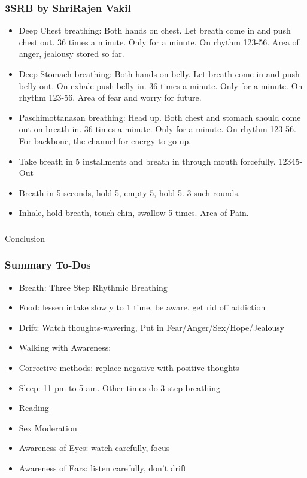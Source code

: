 \begin{frame}[fragile]
\frametitle{3SRB by ShriRajen Vakil}


\begin{itemize}
\item Deep Chest breathing: Both hands on chest. Let breath come in and push chest out. 36 times a minute. Only for a minute. On rhythm 123-56. Area of anger, jealousy stored so far.
\item Deep Stomach breathing: Both hands on belly. Let breath come in and push belly out. On exhale push belly in. 36 times a minute. Only for a minute. On rhythm 123-56. Area of fear and worry for future.
\item Paschimottanasan breathing: Head up. Both chest and stomach should come out on breath in. 36 times a minute. Only for a minute. On rhythm 123-56. For backbone, the channel for energy to go up.
\item Take breath in 5 installments and breath in through mouth forcefully. 12345-Out
\item Breath in 5 seconds, hold 5, empty 5, hold 5. 3 such rounds.
\item Inhale, hold breath, touch chin, swallow 5 times. Area of Pain.

\end{itemize}
\end{frame}

\begin{frame}[fragile]\frametitle{}
\begin{center}
{\Large Conclusion}
\end{center}
\end{frame}



\begin{frame}[fragile]
\frametitle{Summary To-Dos}
\begin{itemize}
\item Breath: Three Step Rhythmic Breathing
\item Food: lessen intake slowly to 1 time, be aware, get rid off addiction
\item Drift: Watch thoughts-wavering, Put in Fear/Anger/Sex/Hope/Jealousy
\item Walking with Awareness: 
\item Corrective methods: replace negative with positive thoughts
\item Sleep: 11 pm to 5 am. Other times do 3 step breathing
\item Reading
\item Sex Moderation
\item Awareness of Eyes: watch carefully, focus
\item Awareness of Ears: listen carefully, don't drift
\end{itemize}
\end{frame}
